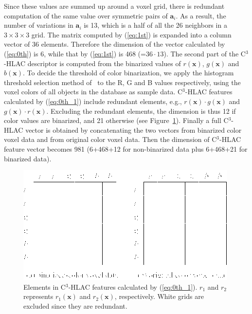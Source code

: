 \documentclass[a4paper, 10 pt, conference]{sty/ieeeconf}
\begin{document}
%
Since these values are summed up around a voxel grid, there is redundant computation of the 
same value over symmetric pairs of ${\bm a_i}$. 
As a result, the number of variations in ${\bm a_i}$ is 13, which is a half of all the 26 neighbors in a $3\times3\times3$ grid.
The matrix computed by (\ref{eq:1st}) is expanded into a column vector of 36 elements.
Therefore the dimension of the vector calculated by (\ref{eq:0th}) is 6, while that by 
(\ref{eq:1st}) is 468 (=$36\cdot13$).
The second part of the C$^3$-HLAC descriptor is computed from the binarized values of $r(\bm{x})$, $g(\bm{x})$ 
and $b(\bm{x})$. 
To decide the threshold of color binarization, 
    we apply the histogram threshold selection method of~\cite{otsu1979} to the R, G and B values respectively, 
    using the voxel colors of all objects in the database as sample data.
C$^3$-HLAC features calculated by (\ref{eq:0th_1}) include redundant elements, e.g., $r(\bm{x})\cdot g(\bm{x})$ and $g(\bm{x})\cdot r(\bm{x})$.
Excluding the redundant elements, the dimension is thus 12 if color values are binarized, and 21 otherwise (see Figure~\ref{fig:eq3_colorCHLAC}). 
Finally a full C$^3$-HLAC vector is obtained by concatenating the two vectors from binarized 
color voxel data and from original color voxel data. Then the dimension of C$^3$-HLAC feature vector 
becomes 981 (6+468+12 for non-binarized data plus 6+468+21 for binarized data). 

\begin{figure}[tb!]
  \begin{center}
    \includegraphics[width=.99\columnwidth]{figures/colorCHLAC/Eq3_in_colorCHLAC.png}
  \caption{Elements in C$^3$-HLAC features calculated by (\ref{eq:0th_1}). $r_1$ and $r_2$ represents $r_1(\bm{x})$ and $r_2(\bm{x})$, respectively. White grids are excluded since they are redundant.}
  \label{fig:eq3_colorCHLAC}
\end{center}
\end{figure}
\end{document}

